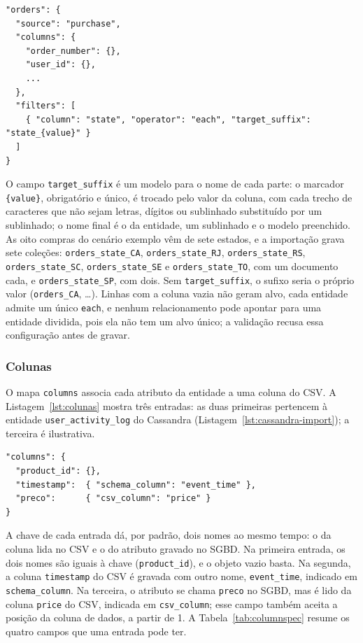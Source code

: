 \begin{lstlisting}[style=jsonstyle,caption={Coleção \texttt{orders} do MongoDB, dividida por estado com o operador \texttt{each}.},label={lst:each-orders}]
"orders": {
  "source": "purchase",
  "columns": {
    "order_number": {},
    "user_id": {},
    ...
  },
  "filters": [
    { "column": "state", "operator": "each", "target_suffix": "state_{value}" }
  ]
}
\end{lstlisting}

O campo \texttt{target\_suffix} é um modelo para o nome de cada parte: o marcador
\texttt{\{value\}}, obrigatório e único, é trocado pelo valor da coluna, com cada trecho
de caracteres que não sejam letras, dígitos ou sublinhado substituído por um sublinhado; o
nome final é o da entidade, um sublinhado e o modelo preenchido. As oito compras do cenário exemplo
vêm de sete estados, e a importação grava sete coleções: \texttt{orders\_state\_CA},
\texttt{orders\_state\_RJ}, \texttt{orders\_state\_RS}, \texttt{orders\_state\_SC},
\texttt{orders\_state\_SE} e \texttt{orders\_state\_TO}, com um documento cada, e
\texttt{orders\_state\_SP}, com dois. Sem \texttt{target\_suffix}, o sufixo seria o próprio
valor (\texttt{orders\_CA}, \ldots). Linhas com a coluna vazia não geram alvo, cada
entidade admite um único \texttt{each}, e nenhum relacionamento pode apontar para uma
entidade dividida, pois ela não tem um alvo único; a validação recusa essa configuração
antes de gravar.

\subsubsection{Colunas}
\label{sec:colunas}

O mapa \texttt{columns} associa cada atributo da entidade a uma coluna do CSV. A
Listagem~\ref{lst:colunas} mostra três entradas: as duas primeiras pertencem à entidade
\texttt{user\_activity\_log} do Cassandra (Listagem~\ref{lst:cassandra-import}); a
terceira é ilustrativa.

\begin{lstlisting}[style=jsonstyle,caption={Três formas de mapear uma coluna.},label={lst:colunas}]
"columns": {
  "product_id": {},
  "timestamp":  { "schema_column": "event_time" },
  "preco":      { "csv_column": "price" }
}
\end{lstlisting}

A chave de cada entrada dá, por padrão, dois nomes ao mesmo tempo: o da coluna lida no CSV
e o do atributo gravado no SGBD. Na primeira entrada, os dois nomes são iguais à chave
(\texttt{product\_id}), e o objeto vazio basta. Na segunda, a coluna \texttt{timestamp} do
CSV é gravada com outro nome, \texttt{event\_time}, indicado em \texttt{schema\_column}.
Na terceira, o atributo se chama \texttt{preco} no SGBD, mas é lido da coluna
\texttt{price} do CSV, indicada em \texttt{csv\_column}; esse campo também aceita a
posição da coluna de dados, a partir de 1. A
Tabela~\ref{tab:columnspec} resume os quatro campos que uma entrada pode ter.

